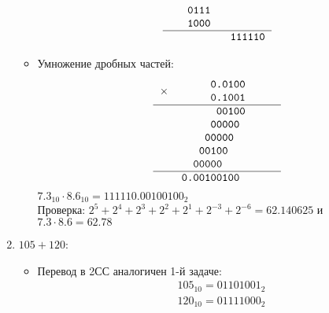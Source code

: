 \documentclass[oneside,a4paper,14pt]{extarticle} %
\begin{document}
\begin{enumerate}
\begin{itemize}
$$\begin{tabular}{{c}{c}}
                    \begin{tabular}{c}
                    \texttt{~~0111}\\
                    \texttt{~~1000}\\
                    \end{tabular} \\ 
                    \hline
                    & \texttt{111110}\\
                    \end{tabular}
                $$
                \item Умножение дробных частей:
                $$
                    \begin{tabular}{{c}{c}}
                    \texttt{$\times$}&
                    \begin{tabular}{c}
                    \texttt{0.0100}\\
                    \texttt{0.1001}\\
                    \end{tabular}\\
                    \hline
                    & \texttt{~00100} \\
                    & \texttt{00000~} \\
                    & \texttt{00000~~~} \\
                    & \texttt{00100~~~~~} \\
                    & \texttt{00000~~~~~~~} \\
                    \hline
                    & \texttt{0.00100100~~~~~~} \\ 
                    \end{tabular}
                $$
                $7.3_{10}\cdot8.6_{10} = 111110.00100100_{2}$\\
                Проверка: $2^{5} + 2^{4} + 2^{3} + 2^{2} + 2^{1} + 2^{-3} + 2^{-6} = 62.140625$ и $7.3\cdot8.6 = 62.78$
            \end{itemize}
            \pagebreak
        \item $105 + 120$:
            \begin{itemize}
                \item Перевод в 2СС аналогичен 1-й задаче:
                    $$
                        \begin{array}{cc}
                            & 105_{10} = 01101001_{2}\\
                            & 120_{10} = 01111000_{2}\\

\end{array}$$
\end{itemize}
\end{enumerate}
\end{document}
